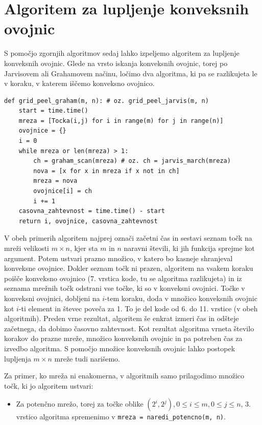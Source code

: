\documentclass[a4paper]{article}
\begin{document}
\section{Algoritem za lupljenje konveksnih ovojnic}
S pomočjo zgornjih algoritmov sedaj lahko izpeljemo algoritem za lupljenje konveksnih ovojnic. Glede na vrsto iskanja konveksnih ovojnic, torej po Jarvisovem ali 
Grahamovem načinu, ločimo dva algoritma, ki pa se razlikujeta le v koraku, v katerem iščemo konveksno ovojnico.

\begin{lstlisting}
def grid_peel_graham(m, n): # oz. grid_peel_jarvis(m, n)
    start = time.time()
    mreza = [Tocka(i,j) for i in range(m) for j in range(n)]
    ovojnice = {}
    i = 0
    while mreza or len(mreza) > 1:
        ch = graham_scan(mreza) # oz. ch = jarvis_march(mreza)
        nova = [x for x in mreza if x not in ch]
        mreza = nova
        ovojnice[i] = ch
        i += 1
    casovna_zahtevnost = time.time() - start 
    return i, ovojnice, casovna_zahtevnost
\end{lstlisting}

V obeh primerih algoritem najprej označi začetni čas in sestavi seznam točk na mreži velikosti $m \times n$, kjer sta $m$ in $n$ naravni števili, ki jih funkcija sprejme kot argument. 
Potem ustvari prazno množico, v katero bo kasneje shranjeval konveksne ovojnice. Dokler seznam točk ni prazen, algoritem na vsakem koraku poišče konveksno ovojnico (7. vrstica kode, 
tu se algoritma razlikujeta) in iz seznama mrežnih točk odstrani vse točke, ki so v konveksni ovojnici. Točke v konveksni ovojnici, dobljeni na $i$-tem koraku, doda v množico konveksnih 
ovojnic kot $i$-ti element in števec poveča za 1. To je del kode od 6. do 11. vrstice (v obeh algoritmih). Preden vrne rezultat, algoritem še enkrat izmeri čas in odšteje začetnega, da 
dobimo časovno zahtevnost. Kot rezultat algoritma vrneta število korakov do prazne mreže, množico konveksnih ovojnic in pa potreben čas za izvedbo algoritma. S pomočjo množice konveksnih 
ovojnic lahko postopek lupljenja $m \times n$ mreže tudi narišemo.

Za primer, ko mreža ni enakomerna, v algoritmih samo prilagodimo množico točk, ki jo algoritem ustvari:

\begin{itemize}
    \item {Za potenčno mrežo, torej za točke oblike $(2^i, 2^j), 0 \leq i \leq m, 0 \leq j \leq n$, 3. vrstico algoritma spremenimo v \lstinline{mreza = naredi_potencno(m, n)}.}
\end{itemize}
\end{document}
